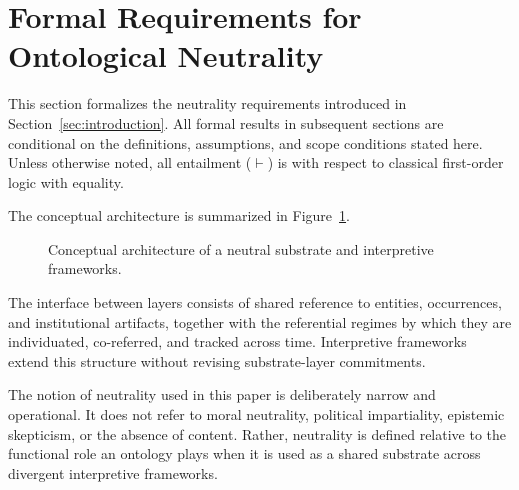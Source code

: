 \section{Formal Requirements for Ontological Neutrality}
\label{sec:requirements}

This section formalizes the neutrality requirements
introduced in Section~\ref{sec:introduction}.
All formal results in subsequent sections are conditional
on the definitions, assumptions, and scope conditions stated here.
Unless otherwise noted, all entailment ($\vdash$) is with respect to
classical first-order logic with equality.

The conceptual architecture is summarized in Figure~\ref{fig:architecture}.

\begin{figure}[!ht]
\centering
{}
\caption{Conceptual architecture of a neutral substrate and interpretive frameworks.}
\label{fig:architecture}
\end{figure}

The interface between layers consists of shared reference to
entities, occurrences, and institutional artifacts,
together with the referential regimes by which they are individuated,
co-referred, and tracked across time.
Interpretive frameworks extend this structure
without revising substrate-layer commitments.

The notion of neutrality used in this paper
is deliberately narrow and operational.
It does not refer to moral neutrality, political impartiality,
epistemic skepticism, or the absence of content.
Rather, neutrality is defined relative to the functional role an ontology
plays when it is used
as a shared substrate across divergent interpretive frameworks.

